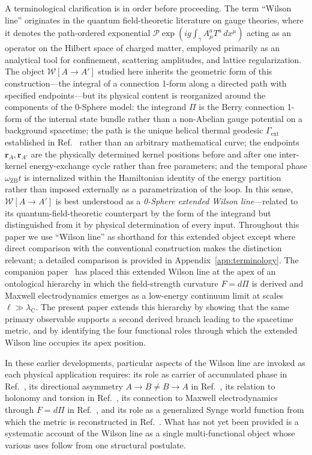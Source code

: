 \documentclass[%
 reprint, amsmath,amssymb, aps, prb, ]{revtex4-2}
\numberwithin{equation}{section}
\newcommand{\omZB}{\omega_{\text{ZB}}}
\newcommand{\WL}{\mathcal{W}}
\newcommand{\lambdaC}{\lambda_{\mathrm{C}}}
\begin{document}
A terminological clarification is in order before proceeding. The term ``Wilson line'' originates in the quantum field-theoretic literature on gauge theories, where it denotes the path-ordered exponential $\mathcal{P}\exp(ig\int_\gamma A_\mu^a T^a\,dx^\mu)$ acting as an operator on the Hilbert space of charged matter, employed primarily as an analytical tool for confinement, scattering amplitudes, and lattice regularization. The object $\WL[A\to A']$ studied here inherits the geometric form of this construction---the integral of a connection 1-form along a directed path with specified endpoints---but its physical content is reorganized around the components of the 0-Sphere model: the integrand $\Pi$ is the Berry connection 1-form of the internal state bundle rather than a non-Abelian gauge potential on a background spacetime; the path is the unique helical thermal geodesic $\Gamma_{\text{ext}}$ established in Ref.~\cite{hanamura51} rather than an arbitrary mathematical curve; the endpoints $\mathbf{r}_A, \mathbf{r}_{A'}$ are the physically determined kernel positions before and after one inter-kernel energy-exchange cycle rather than free parameters; and the temporal phase $\omZB t$ is internalized within the Hamiltonian identity of the energy partition~\cite{hanamura01} rather than imposed externally as a parametrization of the loop. In this sense, $\WL[A\to A']$ is best understood as a \emph{0-Sphere extended Wilson line}---related to its quantum-field-theoretic counterpart by the form of the integrand but distinguished from it by physical determination of every input. Throughout this paper we use ``Wilson line'' as shorthand for this extended object except where direct comparison with the conventional construction makes the distinction relevant; a detailed comparison is provided in Appendix~\ref{app:terminology}. The companion paper~\cite{hanamura54} has placed this extended Wilson line at the apex of an ontological hierarchy in which the field-strength curvature $F = d\Pi$ is derived and Maxwell electrodynamics emerges as a low-energy continuum limit at scales $\ell \gg \lambdaC$. The present paper extends this hierarchy by showing that the same primary observable supports a second derived branch leading to the spacetime metric, and by identifying the four functional roles through which the extended Wilson line occupies its apex position.

In these earlier developments, particular aspects of the Wilson line are invoked as each physical application requires: its role as carrier of accumulated phase in Ref.~\cite{hanamura29}, its directional asymmetry $A\to B \neq B\to A$ in Ref.~\cite{hanamura43}, its relation to holonomy and torsion in Ref.~\cite{hanamura45}, its connection to Maxwell electrodynamics through $F = d\Pi$ in Ref.~\cite{hanamura54}, and its role as a generalized Synge world function from which the metric is reconstructed in Ref.~\cite{hanamura51}. What has not yet been provided is a systematic account of the Wilson line as a single multi-functional object whose various uses follow from one structural postulate.
\end{document}

